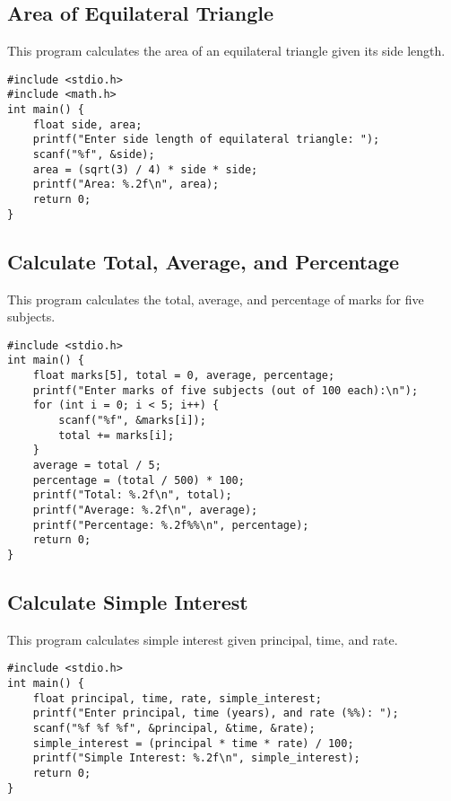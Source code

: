 \documentclass[a4paper,12pt]{article}
\begin{document}
\newpage

\subsection{Area of Equilateral Triangle}
This program calculates the area of an equilateral triangle given its side length.

\begin{lstlisting}[caption={Area of Equilateral Triangle}]
#include <stdio.h>
#include <math.h>
int main() {
    float side, area;
    printf("Enter side length of equilateral triangle: ");
    scanf("%f", &side);
    area = (sqrt(3) / 4) * side * side;
    printf("Area: %.2f\n", area);
    return 0;
}
\end{lstlisting}

\newpage

\subsection{Calculate Total, Average, and Percentage}
This program calculates the total, average, and percentage of marks for five subjects.

\begin{lstlisting}[caption={Calculate Total, Average, and Percentage}]
#include <stdio.h>
int main() {
    float marks[5], total = 0, average, percentage;
    printf("Enter marks of five subjects (out of 100 each):\n");
    for (int i = 0; i < 5; i++) {
        scanf("%f", &marks[i]);
        total += marks[i];
    }
    average = total / 5;
    percentage = (total / 500) * 100;
    printf("Total: %.2f\n", total);
    printf("Average: %.2f\n", average);
    printf("Percentage: %.2f%%\n", percentage);
    return 0;
}
\end{lstlisting}

\newpage

\subsection{Calculate Simple Interest}
This program calculates simple interest given principal, time, and rate.

\begin{lstlisting}[caption={Calculate Simple Interest}]
#include <stdio.h>
int main() {
    float principal, time, rate, simple_interest;
    printf("Enter principal, time (years), and rate (%%): ");
    scanf("%f %f %f", &principal, &time, &rate);
    simple_interest = (principal * time * rate) / 100;
    printf("Simple Interest: %.2f\n", simple_interest);
    return 0;
}
\end{lstlisting}
\end{document}
